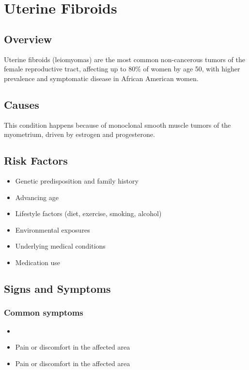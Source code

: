 \chapter{Uterine Fibroids}
\label{sec:Uterine Fibroids}

\section{Overview}
Uterine fibroids (leiomyomas) are the most common non-cancerous tumors of the female reproductive tract, affecting up to 80\% of women by age 50, with higher prevalence and symptomatic disease in African American women.
\section{Causes}
This condition happens because of monoclonal smooth muscle tumors of the myometrium, driven by estrogen and progesterone.     
\section{Risk Factors}

\begin{itemize}[noitemsep]
  \item Genetic predisposition and family history
  \item Advancing age
  \item Lifestyle factors (diet, exercise, smoking, alcohol)
  \item Environmental exposures
  \item Underlying medical conditions
  \item Medication use
\end{itemize}
\section{Signs and Symptoms}

\subsection{Common symptoms}
\begin{itemize}[noitemsep]
  \item \item Pain or discomfort in the affected area    \item Pain or discomfort in the affected area
  \end{itemize}

